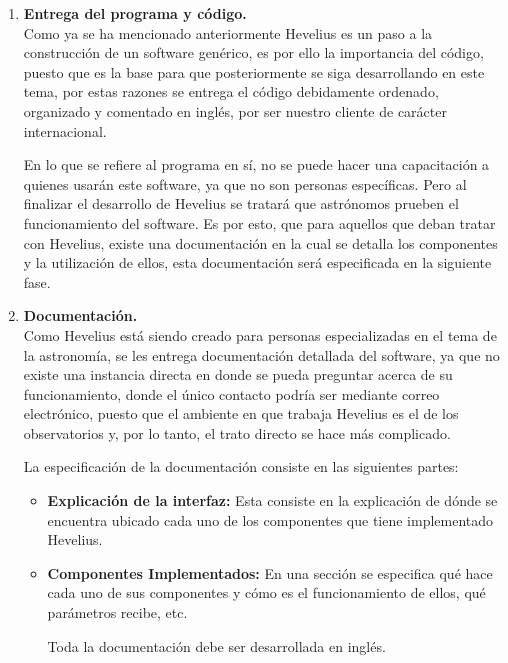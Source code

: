 \documentclass[letterpaper,titlepage,spanish,10pt]{article}
\begin{document}
\begin{enumerate}
	\item {\bf{Entrega del programa y c\'odigo.}}\\
Como ya se ha mencionado anteriormente Hevelius es un paso a la construcci\'on 
de un software gen\'erico, es por ello la importancia del c\'odigo, puesto que 
es la base para que posteriormente se siga desarrollando en este tema, por 
estas razones se entrega el c\'odigo debidamente ordenado, organizado y 
comentado en ingl\'es, por ser nuestro cliente de car\'acter internacional.

En lo que se refiere al programa en s\'i, no se puede hacer una capacitaci\'on 
a quienes usar\'an este software, ya que no son personas espec\'ificas. Pero al 
finalizar el desarrollo de Hevelius se tratar\'a que astr\'onomos prueben el 
funcionamiento del software. Es por esto, que para aquellos que deban tratar 
con Hevelius, existe una documentaci\'on en la cual se detalla los componentes 
y la utilizaci\'on de ellos, esta documentaci\'on ser\'a especificada en la 
siguiente fase.\\

	\item{\bf{Documentaci\'on.}}\\
Como Hevelius est\'a siendo creado para personas especializadas en el tema de 
la astronom\'ia, se les entrega documentaci\'on detallada del software, ya que 
no existe una instancia directa en donde se pueda preguntar acerca de su 
funcionamiento, donde el \'unico contacto podr\'ia ser mediante correo 
electr\'onico, puesto que el ambiente en que trabaja Hevelius es el de los 
observatorios y, por lo tanto, el trato directo se hace m\'as complicado.

La especificaci\'on de la documentaci\'on consiste en las siguientes partes:

\begin{itemize}
	\item {\bf{Explicaci\'on de la interfaz:}} Esta consiste en la 
explicaci\'on de d\'onde se encuentra ubicado cada uno de los componentes que 
tiene implementado Hevelius.
	\item{ \bf{Componentes Implementados:}} En una secci\'on se especifica 
qu\'e hace cada uno de sus componentes y c\'omo es el funcionamiento de ellos, 
qu\'e par\'ametros recibe, etc.

Toda la documentaci\'on debe ser desarrollada en ingl\'es.
\end{itemize}
\end{enumerate}
\end{document}
